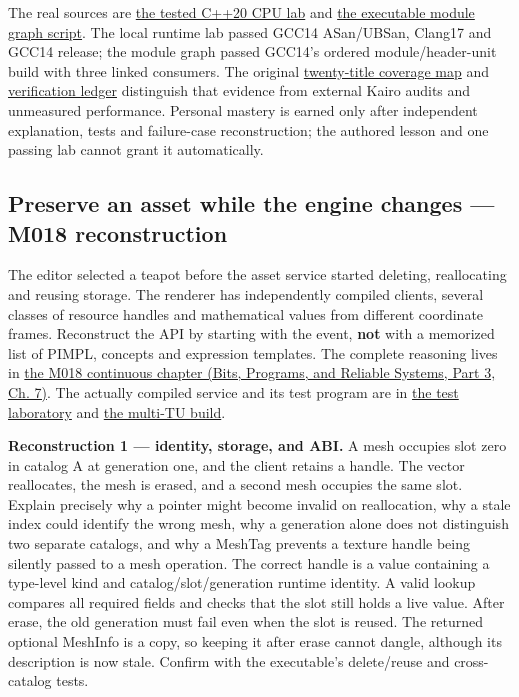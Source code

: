 The real sources are \hyperref[source-file-a1c76c44bc377537c732f5c4]{the tested C++20 CPU lab} and \hyperref[source-file-e1b7c3e4f52da0e7c9c36a41]{the executable module graph script}. The local runtime lab passed GCC14 ASan/UBSan, Clang17 and GCC14 release; the module graph passed GCC14's ordered module/header-unit build with three linked consumers. The original \hyperref[appendix-fd090d982a15-m017-parts-271290-lazy-asset-queries-allocation-lifetimes-and-compiled-api-boundaries]{twenty-title coverage map} and \hyperref[appendix-a103e7846d21-phase-7-additive-reconstruction-m017-parts-271290]{verification ledger} distinguish that evidence from external Kairo audits and unmeasured performance. Personal mastery is earned only after independent explanation, tests and failure-case reconstruction; the authored lesson and one passing lab cannot grant it automatically.

\subsection{Preserve an asset while the engine changes --- M018 reconstruction}\label{appendix-960160274237-preserve-an-asset-while-the-engine-changes-m018-reconstruction}

\hypertarget{appendix-960160274237-preserve-an-asset-while-the-engine-changes-m018-reconstruction}{}

The editor selected a teapot before the asset service started deleting, reallocating and reusing storage. The renderer has independently compiled clients, several classes of resource handles and mathematical values from different coordinate frames. Reconstruct the API by starting with the event, \textbf{not} with a memorized list of PIMPL, concepts and expression templates. The complete reasoning lives in \href{../01-Bits-Programs-and-Reliable-Systems-P03/main.pdf\#nameddest=01-foundations-i-ch007-a-registry-crosses-its-last-c-boundary-hidden-implementation-typed-identity-and-measured-abstraction-cost}{the M018 continuous chapter (Bits, Programs, and Reliable Systems, Part 3, Ch. 7)}. The actually compiled service and its test program are in \hyperref[source-file-8aedc3fdcd10c91971507448]{the test laboratory} and \hyperref[source-file-c936569afa19be638ec87991]{the multi-TU build}.

\textbf{Reconstruction 1 --- identity, storage, and ABI.} A mesh occupies slot zero in catalog A at generation one, and the client retains a handle. The vector reallocates, the mesh is erased, and a second mesh occupies the same slot. Explain precisely why a pointer might become invalid on reallocation, why a stale index could identify the wrong mesh, why a generation alone does not distinguish two separate catalogs, and why a MeshTag prevents a texture handle being silently passed to a mesh operation. The correct handle is a value containing a type-level kind and catalog/slot/generation runtime identity. A valid lookup compares all required fields and checks that the slot still holds a live value. After erase, the old generation must fail even when the slot is reused. The returned optional MeshInfo is a copy, so keeping it after erase cannot dangle, although its description is now stale. Confirm with the executable's delete/reuse and cross-catalog tests.

